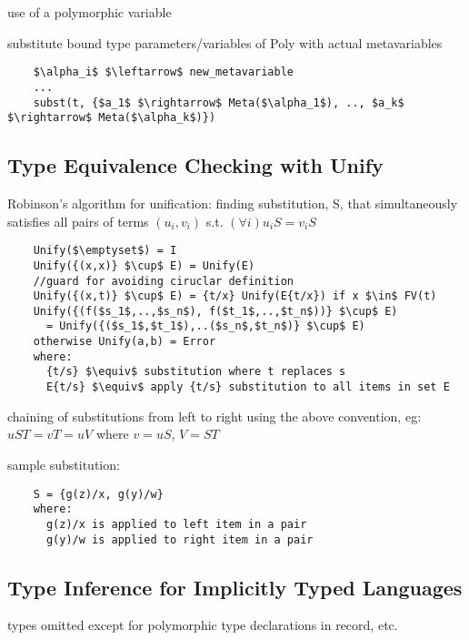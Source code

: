 \documentclass[8pt]{extarticle}
\begin{document}
\begin{multicols*}{2}
  use of a polymorphic variable

  substitute bound type parameters/variables of Poly with actual metavariables

  \begin{lstlisting}
    $\alpha_i$ $\leftarrow$ new_metavariable
    ...
    subst(t, {$a_1$ $\rightarrow$ Meta($\alpha_1$), .., $a_k$ $\rightarrow$ Meta($\alpha_k$)})
  \end{lstlisting}

  \subsection{Type Equivalence Checking with Unify}
  Robinson's algorithm for unification: finding substitution, S, that simultaneously satisfies all pairs of terms $(u_i, v_i)$ s.t. $(\forall i) u_i S = v_i S$

  \begin{lstlisting}
    Unify($\emptyset$) = I
    Unify({(x,x)} $\cup$ E) = Unify(E)
    //guard for avoiding ciruclar definition
    Unify({(x,t)} $\cup$ E) = {t/x} Unify(E{t/x}) if x $\in$ FV(t)
    Unify({(f($s_1$,..,$s_n$), f($t_1$,..,$t_n$))} $\cup$ E)
      = Unify({($s_1$,$t_1$),..($s_n$,$t_n$)} $\cup$ E)
    otherwise Unify(a,b) = Error
    where:
      {t/s} $\equiv$ substitution where t replaces s
      E{t/s} $\equiv$ apply {t/s} substitution to all items in set E
  \end{lstlisting}

  chaining of substitutions from left to right using the above convention, eg: $uST = vT = uV$ where $v = uS$, $V = ST$

  sample substitution:
  \begin{lstlisting}
    S = {g(z)/x, g(y)/w}
    where:
      g(z)/x is applied to left item in a pair
      g(y)/w is applied to right item in a pair
  \end{lstlisting}
  
  \subsection{Type Inference for Implicitly Typed Languages}

  types omitted except for polymorphic type declarations in record, etc.


\end{multicols*}
\end{document}
